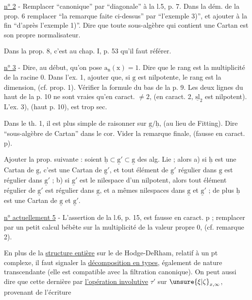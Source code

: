 \uline{n° 2} - Remplacer ``canonique'' par ``diagonale'' à la l.5, p. 7. Dans la dém. de la prop. 6 remplacer ``la remarque faite ci-dessus'' par ``l'exemple 3)'', et ajouter à la fin ``d'après l'exemple 1)''. Dire que toute sous-algèbre qui contient une Cartan est son propre normalisateur.

Dans la prop. 8, c'est au chap. I, p. 53 qu'il faut référer.

\uline{n° 3} - Dire, au début, qu'on pose $\mathrm{a}_{\mathrm{n}}(\mathrm{x})=1$. Dire que le rang est la multiplicité de la racine $0$. Dans l'ex. 1, ajouter que, si $\underline{\mathrm{g}}$ est nilpotente, le rang est la dimension, (cf. prop. 1). Vérifier la formule du bas de la p. 9. Les deux lignes du haut de la p. 10 ne sont vraies qu'en caract. $\neq 2$, (en caract. 2, $\underline{\mathrm{sl}}_2$ est nilpotent). L'ex. 3), (haut p. 10), est trop sec.

Dans le th. 1, il est plus simple de raisonner sur $\underline{\mathrm{g}}/\underline{\mathrm{h}}$, (au lieu de Fitting). Dire ``sous-algèbre de Cartan'' dans le cor. Vider la remarque finale, (fausse en caract. $\mathrm{p}$).

Ajouter la prop. suivante : soient $\underline{\mathrm{h}}\subset\underline{\mathrm{g}}'\subset\underline{\mathrm{g}}$ des alg. Lie ; alors a) si $\underline{\mathrm{h}}$ est une Cartan de $\underline{\mathrm{g}}$, c'est une Cartan de $\underline{\mathrm{g}}'$, et tout élément de $\underline{\mathrm{g}}'$ régulier dans $\underline{\mathrm{g}}$ est régulier dans $\underline{\mathrm{g}}'$ ; b) si $\underline{\mathrm{g}}'$ est le nilespace d'un nilpotent, alors tout élément régulier de $\underline{\mathrm{g}}'$ est régulier dans $\underline{\mathrm{g}}$, et a mêmes nilespaces dans $\underline{\mathrm{g}}$ et $\underline{\mathrm{g}}'$ ; de plus $\underline{\mathrm{h}}$ est une Cartan de $\underline{\mathrm{g}}$ et $\underline{\mathrm{g}}'$.

\uline{n° actuellement 5} - L'assertion de la l.6, p. 15, est fausse en caract. $\mathrm{p}$ ; remplacer par un petit calcul bébête sur la multiplicité de la valeur propre $0$, (cf. remarque 2).

En plus de la \uline{structure entière} sur le   de Hodge-DeRham, relatif à un pt complexe, il faut signaler la \uline{décomposition en types}, également de nature transcendante (elle est compatible avec la filtration canonique). On peut aussi dire que cette dernière   par \uline{l’opération involutive}  $\tau'$ sur $\unsure{\xi|\zeta}_{x,\infty}$, provenant de l’écriture

